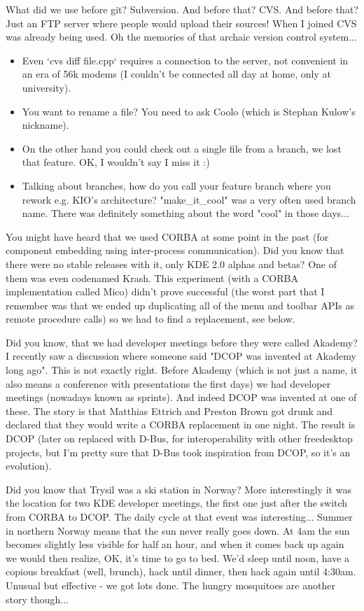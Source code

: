 What did we use before git? Subversion. And before that? CVS. And before that? Just an FTP server where people would upload their sources!
When I joined CVS was already being used. Oh the memories of that archaic version control system...
\begin{itemize}
 \item Even `cvs diff file.cpp` requires a connection to the server, not convenient in an era of 56k modems (I couldn't be connected all day at home, only at university).
 \item You want to rename a file? You need to ask Coolo (which is Stephan Kulow's nickname).
 \item On the other hand you could check out a single file from a branch, we lost that feature. OK, I wouldn't say I miss it :)
 \item Talking about branches, how do you call your feature branch where you rework e.g. KIO's architecture? "make\_it\_cool" was a very often used branch name. There was definitely something about the word "cool" in those days...
\end{itemize}

You might have heard that we used CORBA at some point in the past (for component embedding using inter-process communication). Did you know that there were no stable releases with it, only KDE 2.0 alphas and betas? One of them was even codenamed Krash. This experiment (with a CORBA implementation called Mico) didn't prove successful (the worst part that I remember was that we ended up duplicating all of the menu and toolbar APIs as remote procedure calls) so we had to find a replacement, see below.

Did you know, that we had developer meetings before they were called Akademy? I recently saw a discussion where someone said "DCOP was invented at Akademy long ago". This is not exactly right. Before Akademy (which is not just a name, it also means a conference with presentations the first days) we had developer meetings (nowadays known as sprints). And indeed DCOP was invented at one of these. 
The story is that Matthias Ettrich and Preston Brown got drunk and declared that they would write a CORBA replacement in one night. The result is DCOP (later on replaced with D-Bus, for interoperability with other freedesktop projects, but I'm pretty sure that D-Bus took inspiration from DCOP, so it's an evolution).

Did you know that Trysil was a ski station in Norway? More interestingly it was the location for two KDE developer meetings, the first one just after the switch from CORBA to DCOP.
The daily cycle at that event was interesting... Summer in northern Norway means that the sun never really goes down. At 4am the sun becomes slightly less visible for half an hour, and when it comes back up again we would then realize, OK, it's time to go to bed. We'd sleep until noon, have a copious breakfast (well, brunch), hack until dinner, then hack again until 4:30am. Unusual but effective - we got lots done. The hungry mosquitoes are another story though...

